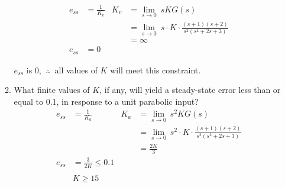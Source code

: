 \documentclass[11pt]{article}
\begin{document}
\begin{enumerate}
\begin{enumerate}
        \begin{align*}
            e_{ss} &=\frac{1}{K_v} &K_v &= \lim_{s \to 0}\ sKG(s)\\
            &&&=\lim_{s \to 0}\ s\cdot K\cdot \displaystyle\frac{(s+1)(s+2)}{s^2(s^2 + 2s + 3)}\\
            &&&=\infty\\
            e_{ss} &=0
        \end{align*}
        \begin{center}
            \(e_{ss}\) is 0, \(\ \therefore\ \) all values of \(K\) will meet this constraint.
        \end{center}
        \item What ﬁnite values of \(K\), if any, will yield a steady-state error less than or equal to 0.1, in response to a unit parabolic input?
        \begin{align*}
            e_{ss} &=\frac{1}{K_a} &K_a &= \lim_{s \to 0}\ s^2KG(s)\\
            &&&=\lim_{s \to 0}\ s^2 \cdot K\cdot \displaystyle\frac{(s+1)(s+2)}{s^2(s^2 + 2s + 3)}\\
            &&&=\frac{2K}{3}\\
            e_{ss} &=\frac{3}{2K}\leq 0.1\\ \\
            &K\geq 15
        \end{align*}


\end{enumerate}
\end{enumerate}
\end{document}
